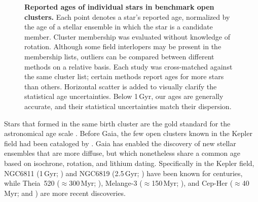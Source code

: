 \documentclass[11pt,twocolumn,tighten]{aastex63}
\begin{document}
\begin{figure}[!t]
	\begin{center}
	\end{center}
	\vspace{-0.5cm}
	\caption{
		{\bf Reported ages of individual stars in benchmark open clusters.}
    Each point denotes a star's reported age, normalized by the age of
    a stellar ensemble in which the star is a candidate member.
    Cluster membership was evaluated without knowledge of rotation.
    Although some field interlopers may be present in the membership
    lists, outliers can be compared between different methods on a
    relative basis.  Each study was cross-matched against the same
    cluster list; certain methods report ages for more stars than
    others.  Horizontal scatter is added to visually clarify the
    statistical age uncertainties.  Below 1\,Gyr, our ages are
    generally accurate, and their statistical uncertainties match
    their dispersion.
	}
	\label{fig:agescalecompone}
\end{figure}

Stars that formed in the same birth cluster are the gold standard for
the astronomical age scale \citep{Soderblom_2010}.  Before Gaia, the
few open clusters known in the Kepler field had been cataloged by
\citet{1864RSPT..154....1H}.  Gaia has enabled the discovery of
new stellar ensembles that are more diffuse, but which nonetheless share a
common age based on isochrone, rotation, and lithium dating.
Specifically in the Kepler field,
NGC6811 (1\,Gyr; \citealt{Curtis_2019_ngc6811}) and NGC6819 (2.5\,Gyr; \citealt{Meibom_2015}) 
have been known for centuries,
while 
Theia~520 ($\approx$300\,Myr; \citealt{2019AJ....158..122K}), Melange-3 ($\approx$150\,Myr; \citealt{Barber_2022}), and Cep-Her ($\approx$40\,Myr; \citealt{Bouma_2022b} and \citealt{Kerr2024}) are more recent discoveries.
\end{document}
